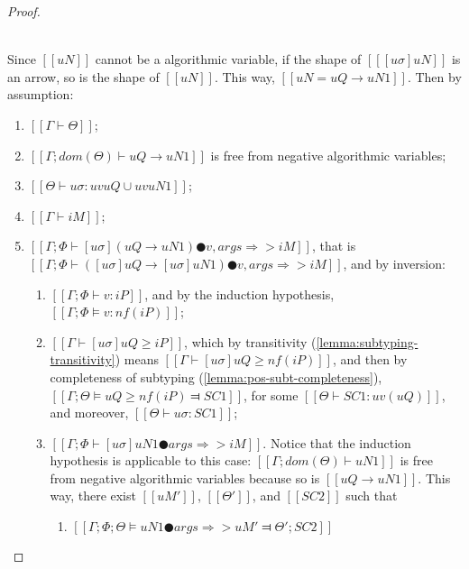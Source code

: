 \begin{proof}
\begin{caseof}
        \item {}\\
            Since $[[uN]]$ cannot be a algorithmic variable,  
            if the shape of $[[ [uσ]uN ]]$ is an arrow, 
            so is the shape of $[[uN]]$. This way, 
            $[[uN = uQ → uN1]]$.
            Then by assumption:
            \begin{enumerate}
                \item $[[Γ ⊢ Θ]]$;
                \item $[[Γ; dom(Θ) ⊢  uQ → uN1]]$ is free from negative algorithmic variables;
                \item $[[Θ ⊢ uσ : uv uQ ∪ uv uN1]]$;
                \item $[[Γ ⊢ iM]]$;
                \item $[[Γ; Φ ⊢ [uσ](uQ → uN1) ● v, args ⇒> iM]]$, 
                    \label{point:typing-completeness-arrow-app-inversion}
                    that is $[[Γ; Φ ⊢ ([uσ]uQ → [uσ]uN1) ● v, args ⇒> iM]]$,
                    and by inversion:
                    \begin{enumerate}
                        \item $[[Γ; Φ ⊢ v : iP]]$,
                            and by the induction hypothesis, 
                            $[[Γ; Φ ⊨ v : nf(iP)]]$;
                        \item $[[Γ ⊢ [uσ]uQ ≥ iP]]$, 
                            which by transitivity (\cref{lemma:subtyping-transitivity}) means 
                            $[[Γ ⊢ [uσ]uQ ≥ nf(iP)]]$,
                            and then by completeness of subtyping 
                            (\cref{lemma:pos-subt-completeness}),
                            $[[ Γ; Θ ⊨ uQ ≥ nf(iP) ⫤ SC1 ]]$, 
                            for some $[[Θ ⊢ SC1 : uv(uQ)]]$, and moreover, $[[ Θ ⊢ uσ : SC1 ]]$;
                        \item $[[Γ; Φ ⊢ [uσ]uN1 ● args ⇒> iM]]$. 
                            \label{point:completeness-arrow-app-ih}
                            Notice that the induction hypothesis is applicable to this case:
                            $[[Γ ; dom(Θ) ⊢  uN1]]$ is free from negative algorithmic variables because
                            so is $[[uQ → uN1]]$. This way, there exist 
                            $[[uM']]$, $[[Θ']]$, and $[[SC2]]$ such that 
                            \begin{enumerate}
                                \item $[[ Γ; Φ; Θ ⊨ uN1 ● args ⇒> uM' ⫤ Θ'; SC2 ]]$

\end{enumerate}
\end{enumerate}
\end{enumerate}
\end{caseof}
\end{proof}
